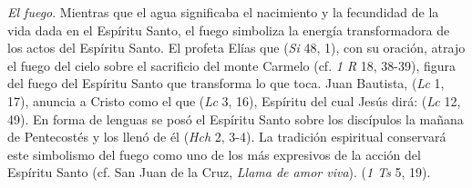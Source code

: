  \emph{El fuego}. Mientras que el agua significaba el nacimiento y la fecundidad de la vida dada en el Espíritu Santo, el fuego simboliza la energía transformadora de los actos del Espíritu Santo. El profeta Elías que  (\emph{Si} 48, 1), con su oración, atrajo el fuego del cielo sobre el sacrificio del monte Carmelo (cf. \emph{1 R} 18, 38-39), figura del fuego del Espíritu Santo que transforma lo que toca. Juan Bautista,  (\emph{Lc} 1, 17), anuncia a Cristo como el que  (\emph{Lc} 3, 16), Espíritu del cual Jesús dirá:  (\emph{Lc} 12, 49). En forma de lenguas  se posó el Espíritu Santo sobre los discípulos la mañana de Pentecostés y los llenó de él (\emph{Hch} 2, 3-4). La tradición espiritual conservará este simbolismo del fuego como uno de los más expresivos de la acción del Espíritu Santo (cf. San Juan de la Cruz, \emph{Llama de amor viva}).  (\emph{1 Ts} 5, 19).